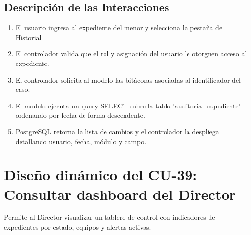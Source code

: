 \subsection{Descripción de las Interacciones}
\begin{enumerate}
    \item El usuario ingresa al expediente del menor y selecciona la pestaña de Historial.
    \item El controlador valida que el rol y asignación del usuario le otorguen acceso al expediente.
    \item El controlador solicita al modelo las bitácoras asociadas al identificador del caso.
    \item El modelo ejecuta un query SELECT sobre la tabla 'auditoria\_expediente' ordenando por fecha de forma descendente.
    \item PostgreSQL retorna la lista de cambios y el controlador la despliega detallando usuario, fecha, módulo y campo.
\end{enumerate}

\cleardoublepage
\section{Diseño dinámico del CU-39: Consultar dashboard del Director}
\label{sec:disenoDinamicoCU39}

Permite al Director visualizar un tablero de control con indicadores de expedientes por estado, equipos y alertas activas.

